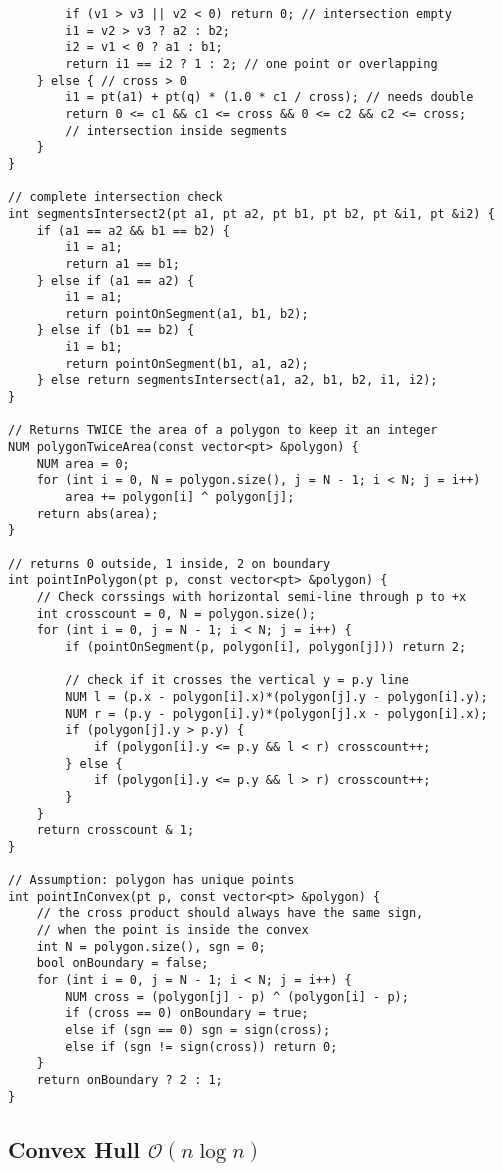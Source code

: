 \documentclass{article}
\begin{document}
\begin{lstlisting}
		if (v1 > v3 || v2 < 0) return 0; // intersection empty
		i1 = v2 > v3 ? a2 : b2;
		i2 = v1 < 0 ? a1 : b1;
		return i1 == i2 ? 1 : 2; // one point or overlapping
	} else { // cross > 0
		i1 = pt(a1) + pt(q) * (1.0 * c1 / cross); // needs double
		return 0 <= c1 && c1 <= cross && 0 <= c2 && c2 <= cross;
		// intersection inside segments
	}
}

// complete intersection check
int segmentsIntersect2(pt a1, pt a2, pt b1, pt b2, pt &i1, pt &i2) {
	if (a1 == a2 && b1 == b2) {
		i1 = a1;
		return a1 == b1;
	} else if (a1 == a2) {
		i1 = a1;
		return pointOnSegment(a1, b1, b2);
	} else if (b1 == b2) {
		i1 = b1;
		return pointOnSegment(b1, a1, a2);
	} else return segmentsIntersect(a1, a2, b1, b2, i1, i2);
}

// Returns TWICE the area of a polygon to keep it an integer
NUM polygonTwiceArea(const vector<pt> &polygon) {
	NUM area = 0;
	for (int i = 0, N = polygon.size(), j = N - 1; i < N; j = i++)
		area += polygon[i] ^ polygon[j];
	return abs(area);
}

// returns 0 outside, 1 inside, 2 on boundary
int pointInPolygon(pt p, const vector<pt> &polygon) {
	// Check corssings with horizontal semi-line through p to +x
	int crosscount = 0, N = polygon.size();
	for (int i = 0, j = N - 1; i < N; j = i++) {
		if (pointOnSegment(p, polygon[i], polygon[j])) return 2;

		// check if it crosses the vertical y = p.y line
		NUM l = (p.x - polygon[i].x)*(polygon[j].y - polygon[i].y);
		NUM r = (p.y - polygon[i].y)*(polygon[j].x - polygon[i].x);
		if (polygon[j].y > p.y) {
			if (polygon[i].y <= p.y && l < r) crosscount++;
		} else {
			if (polygon[i].y <= p.y && l > r) crosscount++;
		}
	}
	return crosscount & 1;
}

// Assumption: polygon has unique points
int pointInConvex(pt p, const vector<pt> &polygon) {
	// the cross product should always have the same sign,
	// when the point is inside the convex
	int N = polygon.size(), sgn = 0;
	bool onBoundary = false;
	for (int i = 0, j = N - 1; i < N; j = i++) {
		NUM cross = (polygon[j] - p) ^ (polygon[i] - p);
		if (cross == 0) onBoundary = true;
		else if (sgn == 0) sgn = sign(cross);
		else if (sgn != sign(cross)) return 0;
	}
	return onBoundary ? 2 : 1;
}

\end{lstlisting}

\subsection{Convex Hull $\mathcal{O}(n \log n)$}
\end{document}
